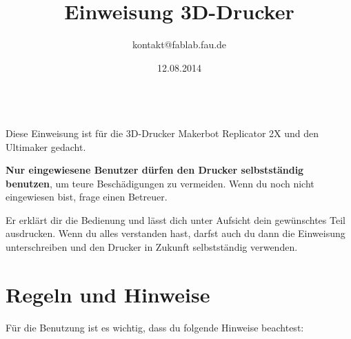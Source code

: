 \documentclass{\basedir/fablab-document}
\date{12.08.2014}
\author{kontakt@fablab.fau.de}
\title{Einweisung 3D-Drucker}
\begin{document}
~\\
Diese Einweisung ist für die 3D-Drucker Makerbot Replicator 2X und den Ultimaker gedacht.

\textbf{Nur eingewiesene Benutzer dürfen den Drucker selbstständig benutzen}, um teure Beschädigungen zu vermeiden. Wenn du noch nicht eingewiesen bist, frage einen Betreuer.

Er erklärt dir die Bedienung und lässt dich unter Aufsicht dein gewünschtes Teil ausdrucken. Wenn du alles verstanden hast, darfst auch du dann die Einweisung unterschreiben und den Drucker in Zukunft selbstständig verwenden.

\section{Regeln und Hinweise}
Für die Benutzung ist es wichtig, dass du folgende Hinweise beachtest:
\end{document}

